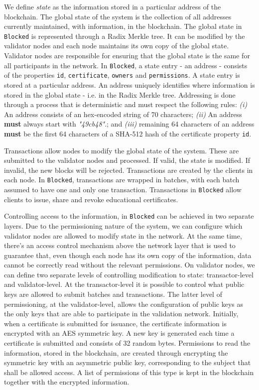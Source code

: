 We define \textit{state} as the information stored in a particular address of the blockchain. The global state of the system is the collection of all addresses currently maintained, with information, in the blockchain. The global state in \texttt{Blocked} is represented through a Radix Merkle tree. It can be modified by the validator nodes and each node maintains its own copy of the global state. Validator nodes are responsible for ensuring that the global state is the same for all participants in the network. In \texttt{Blocked}, a state entry - an address - consists of the properties \texttt{id}, \texttt{certificate}, \texttt{owners} and \texttt{permissions}. A state entry is stored at a particular address. An address uniquely identifies where information is stored in the global state - i.e. in the Radix Merkle tree. Addressing is done through a process that is deterministic and must respect the following rules: \emph{(i)} An address consists of an hex-encoded string of 70 characters; \emph{(ii)} An address \textbf{must} always start with \emph{"49cb48"}.; and \emph{(iii)} remaining 64 characters of an address \textbf{must} be the first 64 characters of a SHA-512 hash of the certificate property \texttt{id}.

Transactions allow nodes to modify the global state of the system. These are submitted to the validator nodes and processed. If valid, the state is modified. If invalid, the new blocks will be rejected. Transactions are created by the clients in each node. In \texttt{Blocked}, transactions are wrapped in batches, with each batch assumed to have one and only one transaction. Transactions in \texttt{Blocked} allow clients to issue, share and revoke educational certificates.

Controlling access to the information, in \texttt{Blocked} can be achieved in two separate layers. Due to the permissioning nature of the system, we can configure which validator nodes are allowed to modify state in the network. At the same time, there's an access control mechanism above the network layer that is used to guarantee that, even though each node has its own copy of the information, data cannot be correctly read without the relevant permissions. On validator nodes, we can define two separate levels of controlling modification to state: transactor-level and validator-level. At the transactor-level it is possible to control what public keys are allowed to submit batches and transactions. The latter level of permissioning, at the validator-level, allows the configuration of public keys as the only keys that are able to participate in the validation network. Initially, when a certificate is submitted for issuance, the certificate information is encrypted with an AES symmetric key. A new key is generated each time a certificate is submitted and consists of 32 random bytes. Permissions to read the information, stored in the blockchain, are created through encrypting the symmetric key with an asymmetric public key, corresponding to the subject that shall be allowed access. A list of permissions of this type is kept in the blockchain together with the encrypted information.

